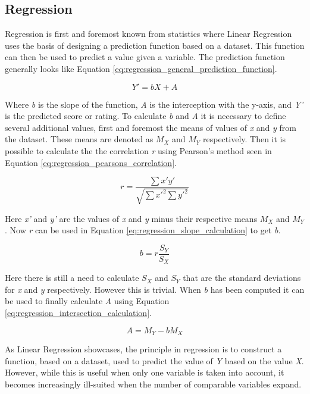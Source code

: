 \subsection{Regression} \label{bg:sub:regression}
Regression is first and foremost known from statistics where Linear Regression uses the basis of designing a prediction function based on a dataset. This function can then be used to predict a value given a variable.
The prediction function generally looks like Equation \ref{eq:regression_general_prediction_function}.

\begin{equation} \label{eq:regression_general_prediction_function}
	Y' = bX + A
\end{equation}

Where \textit{b} is the slope of the function, \textit{A} is the interception with the y-axis, and \textit{Y'} is the predicted score or rating.
To calculate \textit{b} and \textit{A} it is necessary to define several additional values, first and foremost the means of values of \textit{x} and \textit{y} from the dataset. These means are denoted as \textit{$M_{X}$} and \textit{$M_{Y}$} respectively. Then it is possible to calculate the the correlation \textit{r} using Pearson's method seen in Equation \ref{eq:regression_pearsons_correlation}.

\begin{equation} \label{eq:regression_pearsons_correlation}
	r = \frac{\sum x'y'}{\sqrt{\sum x'^{2}\sum y'^{2}}}
\end{equation}

Here \textit{x'} and \textit{y'} are the values of  \textit{x} and \textit{y} minus their respective means \textit{$M_{X}$} and \textit{$M_{Y}$}. Now \textit{r} can be used in Equation \ref{eq:regression_slope_calculation} to get \textit{b}.

\begin{equation} \label{eq:regression_slope_calculation}
	b = r\frac{S_{Y}}{S_{X}}
\end{equation}

Here there is still a need to calculate \textit{$S_{X}$} and \textit{$S_{Y}$} that are the standard deviations for \textit{x} and \textit{y} respectively. However this is trivial. When \textit{b} has been computed it can be used to finally calculate \textit{A} using Equation \ref{eq:regression_intersection_calculation}.

\begin{equation} \label{eq:regression_intersection_calculation}
	A = M_{Y} - bM_{X}
\end{equation}

As Linear Regression showcases, the principle in regression is to construct a function, based on a dataset, used to predict the value of \textit{Y} based on the value \textit{X}. However, while this is useful when only one variable is taken into account, it becomes increasingly ill-suited when the number of comparable variables expand.